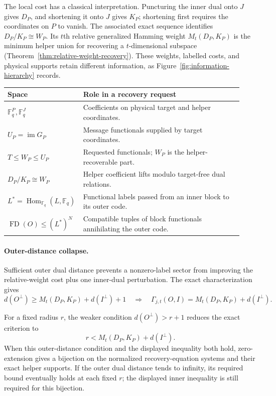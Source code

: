 \documentclass[11pt]{article}
\theoremstyle{definition}
\newcommand{\F}{\mathbb F}
\begin{document}
The local cost has a classical interpretation.  Puncturing the inner dual
onto $J$ gives $D_P$, and shortening it onto $J$ gives $K_P$; shortening first
requires the coordinates on $P$ to vanish.  The associated exact sequence
identifies $D_P/K_P\cong W_P$.  Its $t$th relative generalized Hamming
weight $M_t(D_P,K_P)$ is the minimum helper union for recovering a
$t$-dimensional subspace (Theorem~\ref{thm:relative-weight-recovery}).
These weights, labelled costs, and physical supports retain different
information, as Figure~\ref{fig:information-hierarchy} records.



\begin{center}
\small
\begin{tabular}{@{}>{\raggedright\arraybackslash}p{0.26\linewidth}>{\raggedright\arraybackslash}p{0.67\linewidth}@{}}
\toprule
Space & Role in a recovery request\\ \midrule
$\F_q^P,\F_q^J$ & Coefficients on physical target and helper coordinates.\\
$U_P=\operatorname{im}G_P$ & Message functionals supplied by target coordinates.\\
$T\leq W_P\leq U_P$ & Requested functionals; $W_P$ is the helper-recoverable part.\\
$D_P/K_P\cong W_P$ & Helper coefficient lifts modulo target-free dual relations.\\
$L^*=\operatorname{Hom}_{\F_q}(L,\F_q)$ & Functional labels passed from an inner block to its outer code.\\
$\operatorname{FD}(O)\leq(L^*)^N$ & Compatible tuples of block functionals annihilating the outer code.\\
\bottomrule
\end{tabular}
\end{center}

\paragraph{Outer-distance collapse.}
Sufficient outer dual distance prevents a nonzero-label sector from improving
the relative-weight cost plus one inner-dual perturbation.
The exact characterization gives
\[
 d(O^\perp)\geq M_t(D_P,K_P)+d(I^\perp)+1
 \quad\Longrightarrow\quad
 \Gamma_{j,t}(O,I)=M_t(D_P,K_P)+d(I^\perp).
\]

For a fixed radius $r$, the weaker condition $d(O^\perp)>r+1$ reduces the exact
criterion to
\[
 r<M_t(D_P,K_P)+d(I^\perp).
\]
When this outer-distance condition and the displayed inequality both hold,
zero-extension gives a bijection on the normalized recovery-equation systems
and their exact helper supports.
If the outer dual distance tends to infinity, its required bound eventually
holds at each fixed $r$; the displayed inner inequality is still required
for this bijection.
\end{document}
